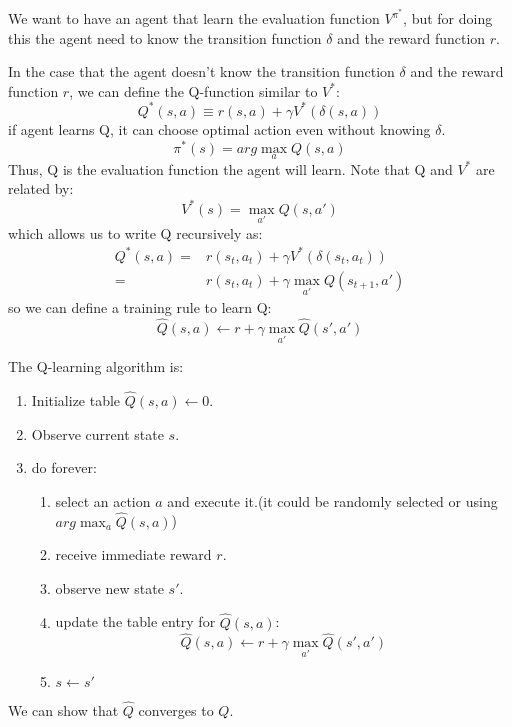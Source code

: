 \documentclass[12pt]{article}
\begin{document}
\begin{enumerate}[label=\textbf{RL.\arabic*}]
    We want to have an agent that learn the evaluation function $V^{\pi^*}$, 
    but for doing this the agent need to know the transition function $\delta$ and the reward function $r$.

    In the case that the agent doesn't know the transition function $\delta$ and the reward function $r$, we can define the Q-function similar to $V^*$:
    \begin{equation}
        Q^*(s,a) \equiv r(s,a) + \gamma V^*(\delta(s,a))
    \end{equation}
    if agent learns Q, it can choose optimal action even without knowing $\delta$.
    \begin{equation}
        \pi^*(s) = arg\max_{a}Q(s,a)
    \end{equation}
    Thus, Q is the evaluation function the agent will learn.
    Note that Q and $V^*$ are related by:
    \begin{equation}
        V^*(s) = \max_{a'}Q(s,a')
    \end{equation}
    which allows us to write Q recursively as:
    \begin{equation}
        \begin{split}
            Q^*(s,a) = & r(s_t,a_t) + \gamma V^*(\delta(s_t,a_t)) \\
            = & r(s_t,a_t) + \gamma\max_{a'}Q(s_{t+1},a')
        \end{split}
    \end{equation}
    so we can define a training rule to learn Q:
    \begin{equation}
        \hat{Q}(s,a) \leftarrow r+\gamma\max_{a'}\hat{Q}(s',a')
    \end{equation}

    The Q-learning algorithm is:
    \begin{enumerate}
        \item Initialize table $\hat{Q}(s,a)\leftarrow 0$.
        \item Observe current state $s$.
        \item do forever:
        \begin{enumerate}
            \item select an action $a$ and execute it.(it could be randomly selected or using $arg\max_a\hat{Q}(s,a)$)
            \item receive immediate reward $r$.
            \item observe new state $s'$.
            \item update the table entry for $\hat{Q}(s,a)$:
            \begin{equation}
                \hat{Q}(s,a) \leftarrow r+\gamma\max_{a'}\hat{Q}(s',a')
            \end{equation}
            \item $s\leftarrow s'$
        \end{enumerate}
    \end{enumerate}
    We can show that $\hat{Q}$ converges to $Q$.


\end{enumerate}
\end{document}
